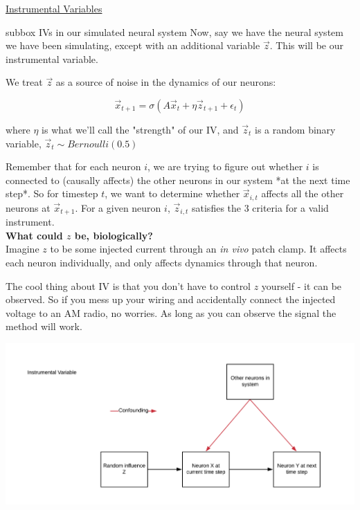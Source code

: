 \begin{textbox}{\href{https://compneuro.neuromatch.io/tutorials/W3D5_NetworkCausality/student/W3D5_Tutorial4.html}{Instrumental Variables }   }
\begin{subbox}{subbox}{ IVs in our simulated neural system
}
\scriptsize
Now, say we have the neural system we have been simulating, except with an additional variable $\vec{z}$. This will be our instrumental variable. 

We treat $\vec{z}$ as a source of noise in the dynamics of our neurons:

\begin{equation}
\vec{x}_{t+1} = \sigma(A\vec{x}_t + \eta \vec{z}_{t+1} + \epsilon_t)
\end{equation}

where $\eta$ is what we'll call the "strength" of our IV, and $\vec{z}_t$ is a random binary variable, $\vec{z}_t \sim Bernoulli(0.5)$

Remember that for each neuron $i$, we are trying to figure out whether $i$ is connected to (causally affects) the other neurons in our system *at the next time step*. So for timestep $t$, we want to determine whether $\vec{x}_{i,t}$ affects all the other neurons at $\vec{x}_{t+1}$. For a given neuron $i$, $\vec{z}_{i,t}$ satisfies the 3 criteria for a valid instrument. \\

\textbf{What could $z$ be, biologically?}\\

Imagine $z$ to be some injected current through an \textit{in vivo} patch clamp. It affects each neuron individually, and only affects dynamics through that neuron.

The cool thing about IV is that you don't have to control $z$ yourself - it can be observed. So if you mess up your wiring and accidentally connect the injected voltage to an AM radio, no worries. As long as you can observe the signal the method will work.
\begin{center}
    
\includegraphics[scale=0.1]{Figures/NC/NC_Figure19.png}


\end{center}
\end{subbox}
\end{textbox}
